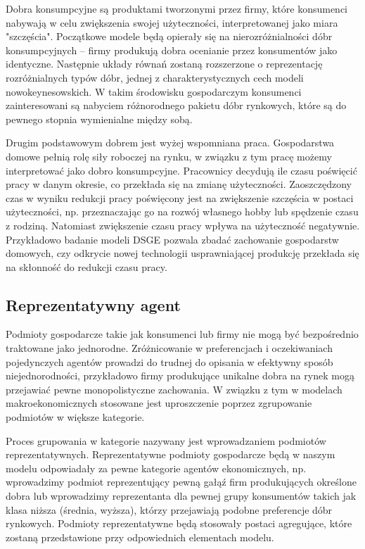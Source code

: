 Dobra konsumpcyjne są produktami tworzonymi przez firmy, które konsumenci nabywają w celu zwiększenia swojej użyteczności, interpretowanej jako miara "szczęścia". Początkowe modele będą opierały się na nierozróżnialności dóbr konsumpcyjnych -- firmy produkują dobra ocenianie przez konsumentów jako identyczne. Następnie układy równań zostaną rozszerzone o reprezentację rozróżnialnych typów dóbr, jednej z charakterystycznych cech modeli nowokeynesowskich. W takim środowisku gospodarczym konsumenci zainteresowani są nabyciem różnorodnego pakietu dóbr rynkowych, które są do pewnego stopnia wymienialne między sobą.

Drugim podstawowym dobrem jest wyżej wspomniana praca. Gospodarstwa domowe pełnią rolę siły roboczej na rynku, w związku z tym pracę możemy interpretować jako dobro konsumpcyjne. Pracownicy decydują ile czasu poświęcić pracy w danym okresie, co przekłada się na zmianę użyteczności. Zaoszczędzony czas w wyniku redukcji pracy poświęcony jest na zwiększenie szczęścia w postaci użyteczności, np. przeznaczając go na rozwój własnego hobby lub spędzenie czasu z rodziną. Natomiast zwiększenie czasu pracy wpływa na użyteczność negatywnie. Przykładowo badanie modeli DSGE pozwala zbadać zachowanie gospodarstw domowych, czy odkrycie nowej technologii usprawniającej produkcję przekłada się na skłonność do redukcji czasu pracy.

\subsection{Reprezentatywny agent}

Podmioty gospodarcze takie jak konsumenci lub firmy nie mogą być bezpośrednio traktowane jako jednorodne. Zróżnicowanie w preferencjach i oczekiwaniach pojedynczych agentów prowadzi do trudnej do opisania w efektywny sposób niejednorodności, przykładowo firmy produkujące unikalne dobra na rynek mogą przejawiać pewne monopolistyczne zachowania. W związku z tym w modelach makroekonomicznych stosowane jest uproszczenie poprzez zgrupowanie podmiotów w większe kategorie.

Proces grupowania w kategorie nazywany jest wprowadzaniem podmiotów reprezentatywnych. Reprezentatywne podmioty gospodarcze będą w naszym modelu odpowiadały za pewne kategorie agentów ekonomicznych, np. wprowadzimy podmiot reprezentujący pewną gałąź firm produkujących określone dobra lub wprowadzimy reprezentanta dla pewnej grupy konsumentów takich jak klasa niższa (średnia, wyższa), którzy przejawiają podobne preferencje dóbr rynkowych. Podmioty reprezentatywne będą stosowały postaci agregujące, które zostaną przedstawione przy odpowiednich elementach modelu.

